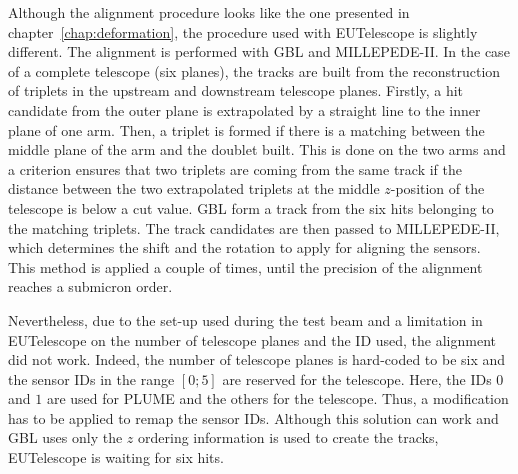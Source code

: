     Although the alignment procedure looks like the one presented in chapter~\ref{chap:deformation}, the procedure used with EUTelescope is slightly different.
    The alignment is performed with \gls{GBL} and MILLEPEDE-II.
    In the case of a complete telescope (six planes), the tracks are built from the reconstruction of triplets in the upstream and downstream telescope planes.
    Firstly, a hit candidate from the outer plane is extrapolated by a straight line to the inner plane of one arm.
    Then, a triplet is formed if there is a matching between the middle plane of the arm and the doublet built.
    This is done on the two arms and a criterion ensures that two triplets are coming from the same track if the distance between the two extrapolated triplets at the middle $z$-position of the telescope is below a cut value.
    \gls{GBL} form a track from the six hits belonging to the matching triplets.
    The track candidates are then passed to MILLEPEDE-II, which determines the shift and the rotation to apply for aligning the sensors.
    This method is applied a couple of times, until the precision of the alignment reaches a submicron order.

    Nevertheless, due to the set-up used during the test beam and a limitation in EUTelescope on the number of telescope planes and the ID used, the alignment did not work.
    Indeed, the number of telescope planes is hard-coded to be six and the sensor IDs in the range $[0; 5]$ are reserved for the telescope. 
    Here, the IDs $0$ and $1$ are used for \gls{PLUME} and the others for the telescope.
    Thus, a modification has to be applied to remap the sensor IDs. 
    Although this solution can work and \gls{GBL} uses only the $z$ ordering information is used to create the tracks, EUTelescope is waiting for six hits.



       


